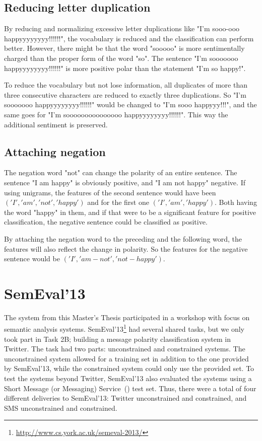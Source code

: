 \subsection{Reducing letter duplication}
By reducing and normalizing excessive letter duplications like "I'm sooo-ooo happyyyyyyyy!!!!!!", the vocabulary is reduced and the classification can perform better. However, there might be that the word "sooooo" is more sentimentally charged than the proper form of the word "so". The sentence "I'm sooooooo happyyyyyyyy!!!!!!" is more positive polar than the statement "I'm so happy!".

To reduce the vocabulary but not lose information, all duplicates of more than three consecutive characters are reduced to exactly three duplications. So "I'm sooooooo happyyyyyyyy!!!!!!" would be changed to "I'm sooo happyyy!!!", and the same goes for "I'm sooooooooooooooo happyyyyyyyy!!!!!!". This way the additional sentiment is preserved.

\subsection{Attaching negation}

The negation word "not" can change the polarity of an entire sentence. The sentence "I am happy" is obviously positive, and "I am not happy" negative. If using unigrams, the features of the second sentence would have been $('I', 'am', 'not', 'happy')$ and for the first one $('I', 'am', 'happy')$. Both having the word "happy" in them, and if that were to be a significant feature for positive classification, the negative sentence could be classified as positive.

By attaching the negation word to the preceding and the following word, the features will also reflect the change in polarity. So the features for the negative sentence would be $('I', 'am-not', 'not-happy')$.

\section{SemEval'13}

The system from this Master's Thesis participated in a workshop with focus on semantic analysis systems. SemEval'13\footnote{\url{http://www.cs.york.ac.uk/semeval-2013/}} had several shared tasks, but we only took part in Task 2B; building a message polarity classification system in Twitter. The task had two parts: unconstrained and constrained systems. The unconstrained system allowed for a training set in addition to the one provided by SemEval'13, while the constrained system could only use the provided set. To test the systems beyond Twitter, SemEval'13 also evaluated the systems using a Short Message (or Messaging) Service~() test set. Thus, there were a total of four different deliveries to SemEval'13: Twitter unconstrained and constrained, and SMS unconstrained and constrained.

